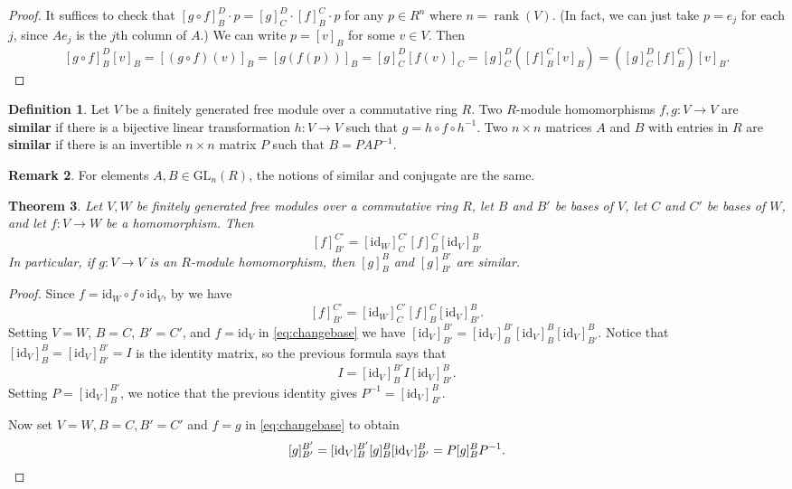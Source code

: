 \documentclass[12pt]{report}
\newtheorem{theorem}{Theorem}[chapter]
\numberwithin{equation}{section}
\numberwithin{theorem}{chapter}
\theoremstyle{definition}
\newtheorem{definition}[theorem]{Definition}
\newtheorem*{basic properties}{Basic Properties}
\newtheorem*{Important Remark}{Important Remark}
\newtheorem{remark}[theorem]{Remark}
\newcommand{\df}[1]{{\bf #1}\index{#1}}
\DeclareMathOperator{\rank}{rank}
\begin{document}
\begin{proof} It suffices to check that $[g\circ f]_B^D \cdot p=[g]_C^D \cdot [f]_B^C \cdot p$ for any $p\in R^n$ where $n=\rank(V)$. (In fact, we can just take $p=e_j$ for each $j$, since $Ae_j$ is the $j$th column of $A$.) We can write $p=[v]_B$ for some $v\in V$. Then 
\[ [g\circ f]_B^D [v]_B = [(g\circ f)(v)]_B = [g(f(p))]_B = [g]_C^D [f(v)]_C = [g]_C^D ([f]_B^C [v]_B) = ([g]_C^D [f]_B^C) [v]_B.\]
\end{proof} 


\begin{definition}
Let $V$ be a finitely generated free module over a commutative ring $R$. Two $R$-module homomorphisms $f,g: V \to V$ are \df{similar} if there is a bijective linear transformation $h: V \to V$ such that $g = h\circ f \circ h^{-1}$. Two $n \times n$ matrices $A$ and $B$ with entries in $R$ are \df{similar} if there is an invertible $n \times n$ matrix $P$ such that $B = PAP^{-1}$.
 \end{definition}

 \begin{remark}
 For elements $A,B\in \textrm{GL}_n(R)$, the notions of similar and conjugate are the same. 
 \end{remark}
 
 
\begin{theorem}\label{prop:changebase}
Let $V, W$  be finitely generated free modules over a commutative ring $R$, let $B$ and $B'$ be bases of $V$, let $C$ and $C'$ be bases of $W$, and let $f: V \to W$ be a homomorphism. Then 
\begin{equation}\label{eq:changebase}
[f]_{B'}^{C'} = [\mathrm{id}_W]_C^{C'} [f]_B^C [\mathrm{id}_V]_{B'}^{B}
\end{equation}
In particular, if $g\!: V \to V$ is an $R$-module homomorphism, then $[g]_B^B$ and $[g]_{B'}^{B'}$ are similar.
\end{theorem}
 
\begin{proof}
Since $f=\mathrm{id}_W\circ f\circ \mathrm{id}_V$, by  we have 
$$[f]_{B'}^{C'} = [\mathrm{id}_W]_C^{C'} [f]_B^C [\mathrm{id}_V]_{B'}^{B}.$$
Setting $V=W$, $B=C$, $B'=C'$, and $f=\mathrm{id}_V$ in \eqref{eq:changebase} we have $[\mathrm{id}_V]_{B'}^{B'} = [\mathrm{id}_V]_B^{B'} [\mathrm{id}_V]_B^B [\mathrm{id}_V]_{B'}^{B}$. Notice that $[\mathrm{id}_V]_{B}^{B} =[\mathrm{id}_V]_{B'}^{B'} =I$ is the identity matrix, so the previous formula says that 
$$I = [\mathrm{id}_V]_B^{B'} I [\mathrm{id}_V]_{B'}^{B}.$$ 
Setting $P= [\mathrm{id}_V]_B^{B'} $, we notice that the previous identity gives $P^{-1}=[\mathrm{id}_V]_{B'}^{B}$.
 
Now set $V=W,B=C,B'=C'$ and $f=g$ in \eqref{eq:changebase} to obtain
$$[g]_{B'}^{B'} = [\mathrm{id}_V]_B^{B'} [g]_B^B [\mathrm{id}_V]_{B'}^{B}=P[g]_B^B P^{-1}.\qedhere$$ 
\end{proof}
\end{document}
